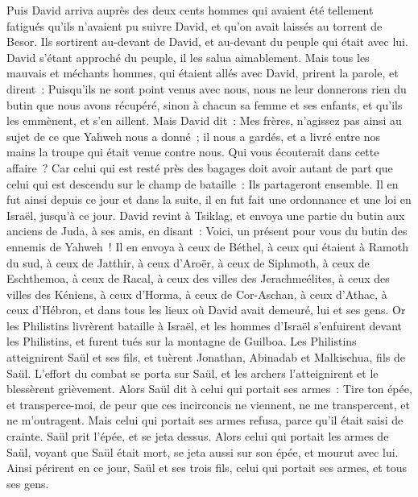 \begin{multicols}{2}
Puis David arriva auprès des deux cents hommes qui avaient été tellement fatigués qu'ils n'avaient pu suivre David, et qu'on avait laissés au torrent de Besor. Ils sortirent au-devant de David, et au-devant du peuple qui était avec lui. David s'étant approché du peuple, il les salua aimablement.
Mais tous les mauvais et méchants hommes, qui étaient allés avec David, prirent la parole, et dirent~: Puisqu'ils ne sont point venus avec nous, nous ne leur donnerons rien du butin que nous avons récupéré, sinon à chacun sa femme et ses enfants, et qu'ils les emmènent, et s'en aillent.
Mais David dit~: Mes frères, n'agissez pas ainsi au sujet de ce que Yahweh nous a donné~; il nous a gardés, et a livré entre nos mains la troupe qui était venue contre nous.
Qui vous écouterait dans cette affaire~? Car celui qui est resté près des bagages doit avoir autant de part que celui qui est descendu sur le champ de bataille~: Ils partageront ensemble.
Il en fut ainsi depuis ce jour et dans la suite, il en fut fait une ordonnance et une loi en Israël, jusqu'à ce jour.
David revint à Tsiklag, et envoya une partie du butin aux anciens de Juda, à ses amis, en disant~: Voici, un présent pour vous du butin des ennemis de Yahweh~!
Il en envoya à ceux de Béthel, à ceux qui étaient à Ramoth du sud, à ceux de Jatthir,
à ceux d'Aroër, à ceux de Siphmoth, à ceux de Eschthemoa,
à ceux de Racal, à ceux des villes des Jerachmeélites, à ceux des villes des Kéniens,
à ceux d'Horma, à ceux de Cor-Aschan, à ceux d'Athac,
à ceux d'Hébron, et dans tous les lieux où David avait demeuré, lui et ses gens.
\VerseOne{}Or les Philistins livrèrent bataille à Israël, et les hommes d'Israël s'enfuirent devant les Philistins, et furent tués sur la montagne de Guilboa.
Les Philistins atteignirent Saül et ses fils, et tuèrent Jonathan, Abinadab et Malkischua, fils de Saül.
L'effort du combat se porta sur Saül, et les archers l'atteignirent et le blessèrent grièvement.
Alors Saül dit à celui qui portait ses armes~: Tire ton épée, et transperce-moi, de peur que ces incirconcis ne viennent, ne me transpercent, et ne m'outragent. Mais celui qui portait ses armes refusa, parce qu'il était saisi de crainte. Saül prit l'épée, et se jeta dessus.
Alors celui qui portait les armes de Saül, voyant que Saül était mort, se jeta aussi sur son épée, et mourut avec lui.
Ainsi périrent en ce jour, Saül et ses trois fils, celui qui portait ses armes, et tous ses gens.

\end{multicols}
